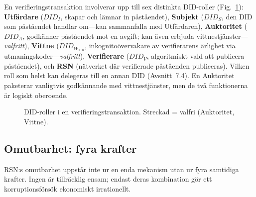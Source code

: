 \documentclass[11pt,a4paper,twocolumn]{article}
\begin{document}
En verifieringstransaktion involverar upp till sex distinkta DID-roller (Fig.~\ref{fig:roles}): \textbf{Utfärdare} ($DID_I$, skapar och lämnar in påståendet), \textbf{Subjekt} ($DID_S$, den DID som påståendet handlar om---kan sammanfalla med Utfärdaren), \textbf{Auktoritet} ($DID_A$, godkänner påståendet mot en avgift; kan även erbjuda vittnestjänster---\emph{valfritt}), \textbf{Vittne} ($DID_{W_{1..n}}$, inkognitoövervakare av verifierarens ärlighet via utmaningskoder---\emph{valfritt}), \textbf{Verifierare} ($DID_V$, algoritmiskt vald att publicera påståendet), och \textbf{RSN} (nätverket där verifierade påståenden publiceras). Vilken roll som helst kan delegeras till en annan DID (Avsnitt~7.4). En Auktoritet paketerar vanligtvis godkännande med vittnestjänster, men de två funktionerna är logiskt oberoende.

\begin{figure}[ht]
\centering
{}
\caption{DID-roller i en verifieringstransaktion. Streckad = valfri (Auktoritet, Vittne).}
\label{fig:roles}
\end{figure}

\subsection{Omutbarhet: fyra krafter}

RSN:s omutbarhet uppstår inte ur en enda mekanism utan ur fyra samtidiga krafter. Ingen är tillräcklig ensam; endast deras kombination gör ett korruptionsförsök ekonomiskt irrationellt.
\end{document}
